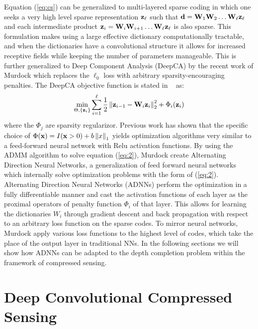 Equation (\ref{eq:cs}) can be generalized to multi-layered sparse coding in which one seeks a very high level sparse representation $\mathbf{z}_{\ell}$ such that $\mathbf{d} = \mathbf{W}_1\mathbf{W}_2\ldots \mathbf{W}_{\ell}\mathbf{z}_{\ell}$ and each intermediate product $\mathbf{z}_i = \mathbf{W}_i\mathbf{W}_{i+1}\ldots \mathbf{W}_{\ell}\mathbf{z}_{\ell}$ is also sparse. This formulation makes using a large effective dictionary computationally tractable, and when the dictionaries have a convolutional structure it allows for increased receptive fields while keeping the number of parameters manageable. This is further generalized to Deep Component Analysis (DeepCA) by the recent work of Murdock \etal which replaces the $\ell_0$ loss with arbitrary sparsity-encouraging penalties. The DeepCA objective function is stated in ~\cite{} as:
\begin{equation}
  \label{eq:2}
  \min_{\Theta, \{\mathbf{z}_i\}} \sum_{i=1}^{\ell} \frac{1}{2} \left\Vert \mathbf{z}_{i-1} - \mathbf{W}_i\mathbf{z}_i\right\Vert_2^2 + \Phi_i(\mathbf{z}_i)
\end{equation}
where the $\Phi_j$ are sparsity regularizor. Previous work has shown that the specific choice of $\Phi(\mathbf{x}) = I(\mathbf{x} > 0) + b\left\Vert x\right\Vert_1$ yields optimization algorithms very similar to a feed-forward neural network with Relu activation functions. By using the ADMM algorithm to solve equation (\ref{eq:2}), Murdock \etal create Alternating Direction Neural Networks, a generalization of feed forward neural networks which internally solve optimization problems with the form of (\ref{eq:2}). Alternating Direction Neural Networks (ADNNs) perform the optimization in a fully differentiable manner and cast the activation functions of each layer as the proximal operators of penalty function $\Phi_i$ of that layer. This allows for learning the dictionaries $W_i$ through gradient descent and back propagation with respect to an arbitrary loss function on the sparse codes. To mirror neural networks, Murdock \etal apply various loss functions to the highest level of codes, which take the place of the output layer in traditional NNs. In the following sections we will show how ADNNs can be adapted to the depth completion problem within the framework of compressed sensing.\\

\section{Deep Convolutional Compressed Sensing}
\label{sec:dccs}


